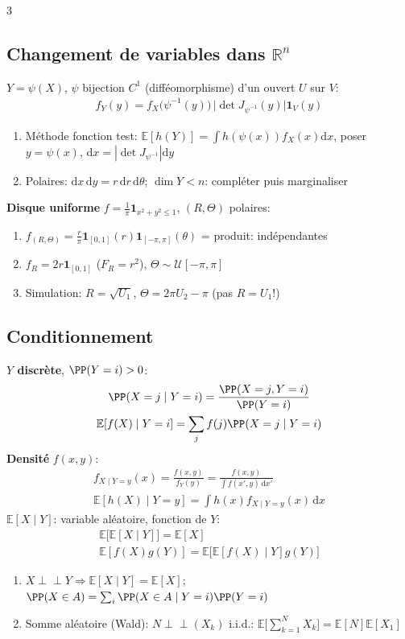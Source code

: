 \documentclass[12pt, a4paper]{article}
\newcommand{\dd}{\mathrm{d}}
\newcommand{\E}{\mathbb{E}}
\newcommand{\R}{\mathbb{R}}
\newcommand{\ind}{\mathbf{1}}
\begin{document}
\begin{multicols*}{3}
	\subsection{Changement de variables dans $\R^n$}
	$Y=\psi(X)$, $\psi$ bijection $C^1$ (difféomorphisme) d'un ouvert $U$ sur $V$:
	\begin{gather*}
		f_Y(y)=f_X\big(\psi^{-1}(y)\big)\,\big|\det J_{\psi^{-1}}(y)\big|\ind_V(y)
	\end{gather*}
	\begin{enumerate}[\roman*.]
		\item Méthode fonction test: $\E[h(Y)]=\int h(\psi(x))f_X(x)\dd x$, poser $y=\psi(x)$, $\dd x=|\det J_{\psi^{-1}}|\dd y$
		\item Polaires: $\dd x\,\dd y=r\,\dd r\,\dd\theta$; $\dim Y<n$: compléter puis marginaliser
	\end{enumerate}
	\textbf{Disque uniforme} $f=\frac1\pi\ind_{x^2+y^2\leq1}$, $(R,\Theta)$ polaires:
	\begin{enumerate}[\roman*.]
		\item $f_{(R,\Theta)}=\frac r\pi\ind_{[0,1]}(r)\ind_{[-\pi,\pi]}(\theta)$ = produit: indépendantes
		\item $f_R=2r\ind_{[0,1]}$ ($F_R=r^2$), $\Theta\sim\mathcal U[-\pi,\pi]$
		\item Simulation: $R=\sqrt{U_1}$, $\Theta=2\pi U_2-\pi$ (pas $R=U_1$!)
	\end{enumerate}

	\subsection{Conditionnement}
	\textbf{$Y$ discrète}, $\PP(Y=i)>0$:
	\begin{gather*}
		\PP(X=j\mid Y=i)=\frac{\PP(X=j,Y=i)}{\PP(Y=i)}\\
		\E[f(X)\mid Y=i]=\sum_jf(j)\PP(X=j\mid Y=i)
	\end{gather*}
	\textbf{Densité} $f(x,y)$:
	\begin{gather*}
		f_{X\mid Y=y}(x)=\frac{f(x,y)}{f_Y(y)}=\frac{f(x,y)}{\int f(x',y)\,\dd x'}\\
		\E[h(X)\mid Y=y]=\int h(x)f_{X\mid Y=y}(x)\,\dd x
	\end{gather*}
	$\E[X\mid Y]$: variable aléatoire, fonction de $Y$:
	\begin{gather*}
		\E\big[\E[X\mid Y]\big]=\E[X]\\ \E[f(X)g(Y)]=\E\big[\E[f(X)\mid Y]g(Y)\big]
	\end{gather*}
	\begin{enumerate}[\roman*.]
		\item $X\perp\!\!\!\perp Y\Rightarrow\E[X\mid Y]=\E[X]$; $\PP(X\in A)=\sum_i\PP(X\in A\mid Y=i)\PP(Y=i)$
		\item Somme aléatoire (Wald): $N\perp\!\!\!\perp(X_k)$ i.i.d.: $\E\big[\sum_{k=1}^NX_k\big]=\E[N]\E[X_1]$
	\end{enumerate}


\end{multicols*}
\end{document}
